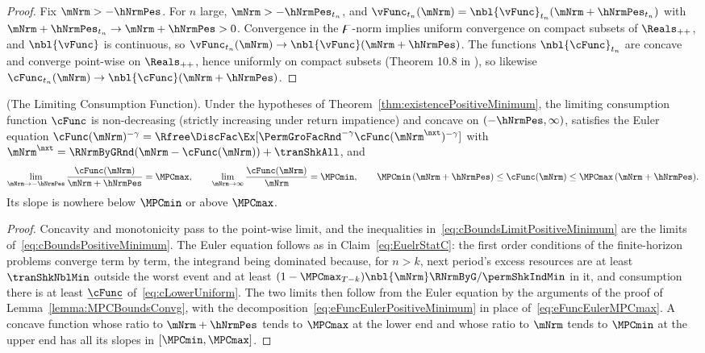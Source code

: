 \documentclass[\econtexRoot/BufferStockTheory]{subfiles}
\begin{document}
\begin{proof}
Fix $\mNrm>-\hNrmPes$.
For $n$ large, $\mNrm>-\hNrmPes_{t_{n}}$, and $\vFunc_{t_{n}}(\mNrm)=\nbl{\vFunc}_{t_{n}}(\mNrm+\hNrmPes_{t_{n}})$ with $\mNrm+\hNrmPes_{t_{n}}\rightarrow\mNrm+\hNrmPes>0$.
Convergence in the $\digamma$-norm implies uniform convergence on compact subsets of $\Reals_{++}$, and $\nbl{\vFunc}$ is continuous, so $\vFunc_{t_{n}}(\mNrm)\rightarrow\nbl{\vFunc}(\mNrm+\hNrmPes)$.
The functions $\nbl{\cFunc}_{t_{n}}$ are concave and converge point-wise on $\Reals_{++}$, hence uniformly on compact subsets (Theorem 10.8 in \cite{Rockafellar1972}), so likewise $\cFunc_{t_{n}}(\mNrm)\rightarrow\nbl{\cFunc}(\mNrm+\hNrmPes)$.
\end{proof}

\begin{lemma}(The Limiting Consumption Function).\label{lemma:MPCBoundsConvgPositiveMinimum}
Under the hypotheses of Theorem~\ref{thm:existencePositiveMinimum}, the limiting consumption function $\cFunc$ is non-decreasing (strictly increasing under return impatience) and concave on $(-\hNrmPes,\infty)$, satisfies the Euler equation $\cFunc(\mNrm)^{-\CRRA}=\Rfree\DiscFac\Ex[\PermGroFacRnd^{-\CRRA}\cFunc(\mNrm^{\nxt})^{-\CRRA}]$ with $\mNrm^{\nxt}=\RNrmByGRnd(\mNrm-\cFunc(\mNrm))+\tranShkAll$, and
\begin{equation}\label{eq:cBoundsLimitPositiveMinimum}
  \lim_{\mNrm\rightarrow-\hNrmPes}\frac{\cFunc(\mNrm)}{\mNrm+\hNrmPes}=\MPCmax,\qquad
  \lim_{\mNrm\rightarrow\infty}\frac{\cFunc(\mNrm)}{\mNrm}=\MPCmin,\qquad
  \MPCmin\,(\mNrm+\hNrmPes)\leq\cFunc(\mNrm)\leq\MPCmax\,(\mNrm+\hNrmPes).
\end{equation}
Its slope is nowhere below $\MPCmin$ or above $\MPCmax$.
\end{lemma}

\begin{proof}
Concavity and monotonicity pass to the point-wise limit, and the inequalities in~\eqref{eq:cBoundsLimitPositiveMinimum} are the limits of~\eqref{eq:cBoundsPositiveMinimum}.
The Euler equation follows as in Claim~\ref{eq:EuelrStatC}: the first order conditions of the finite-horizon problems converge term by term, the integrand being dominated because, for $n>k$, next period's excess resources are at least $\tranShkNblMin$ outside the worst event and at least $(1-\MPCmax_{T-k})\nbl{\mNrm}\RNrmByG/\permShkIndMin$ in it, and consumption there is at least $\underline{\cFunc}$ of~\eqref{eq:cLowerUniform}.
The two limits then follow from the Euler equation by the arguments of the proof of Lemma~\ref{lemma:MPCBoundsConvg}, with the decomposition~\eqref{eq:eFuncEulerPositiveMinimum} in place of~\eqref{eq:eFuncEulerMPCmax}.
A concave function whose ratio to $\mNrm+\hNrmPes$ tends to $\MPCmax$ at the lower end and whose ratio to $\mNrm$ tends to $\MPCmin$ at the upper end has all its slopes in $[\MPCmin,\MPCmax]$.
\end{proof}
\end{document}

